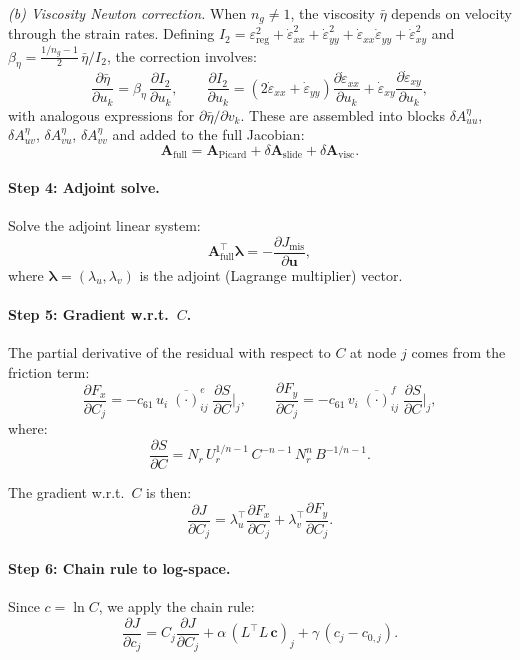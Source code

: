 \documentclass[a4paper,11pt,fleqn]{article}
\newcommand{\ve}[1]{\boldsymbol{#1}}
\newcommand{\be}{\begin{equation}}
\newcommand{\ee}{\end{equation}}
\newcommand{\pd}[2]{\frac{\partial #1}{\partial #2}}
\newcommand{\eps}{\varepsilon}
\newcommand{\bm}[1]{\boldsymbol{#1}}
\begin{document}
\medskip
\noindent\textit{(b) Viscosity Newton correction.} When $n_g \neq 1$, the viscosity $\bar\eta$ depends on velocity through the strain rates. Defining $I_2 = \eps_{\mathrm{reg}}^2 + \dot\eps_{xx}^2 + \dot\eps_{yy}^2 + \dot\eps_{xx}\dot\eps_{yy} + \dot\eps_{xy}^2$ and $\beta_\eta = \frac{1/n_g - 1}{2}\,\bar\eta / I_2$, the correction involves:
\be
\pd{\bar\eta}{u_k} = \beta_\eta\,\pd{I_2}{u_k}, \qquad \pd{I_2}{u_k} = (2\dot\eps_{xx} + \dot\eps_{yy})\pd{\dot\eps_{xx}}{u_k} + \dot\eps_{xy}\pd{\dot\eps_{xy}}{u_k},
\ee
with analogous expressions for $\partial\bar\eta/\partial v_k$. These are assembled into blocks $\delta A^{\eta}_{uu}$, $\delta A^{\eta}_{uv}$, $\delta A^{\eta}_{vu}$, $\delta A^{\eta}_{vv}$ and added to the full Jacobian:
\be
\mathbf{A}_{\mathrm{full}} = \mathbf{A}_{\mathrm{Picard}} + \delta\mathbf{A}_{\mathrm{slide}} + \delta\mathbf{A}_{\mathrm{visc}}.
\ee

\paragraph{Step 4: Adjoint solve.}
Solve the adjoint linear system:
\be
\label{eq:adjoint_solve}
\mathbf{A}_{\mathrm{full}}^\top \bm{\lambda} = -\pd{J_{\mathrm{mis}}}{\ve{u}},
\ee
where $\bm{\lambda} = (\lambda_u, \lambda_v)$ is the adjoint (Lagrange multiplier) vector.

\paragraph{Step 5: Gradient w.r.t.\ $C$.}
The partial derivative of the residual with respect to $C$ at node $j$ comes from the friction term:
\be
\pd{F_x}{C_j} = -c_{61}\, u_i\;\overline{(\cdot)}_{ij}^e\;\pd{S}{C}\bigg|_j, \qquad
\pd{F_y}{C_j} = -c_{61}\, v_i\;\overline{(\cdot)}_{ij}^f\;\pd{S}{C}\bigg|_j,
\ee
where:
\be
\pd{S}{C} = N_r\, U_r^{1/n-1}\, C^{-n-1}\, N_r^n\, B^{-1/n-1}.
\ee

The gradient w.r.t.\ $C$ is then:
\be
\pd{J}{C_j} = \lambda_u^\top \pd{F_x}{C_j} + \lambda_v^\top \pd{F_y}{C_j}.
\ee

\paragraph{Step 6: Chain rule to log-space.}
Since $c = \ln C$, we apply the chain rule:
\be
\pd{J}{c_j} = C_j \pd{J}{C_j} + \alpha\,(L^\top L\, \ve{c})_j + \gamma\,(c_j - c_{0,j}).
\ee

\end{document}
